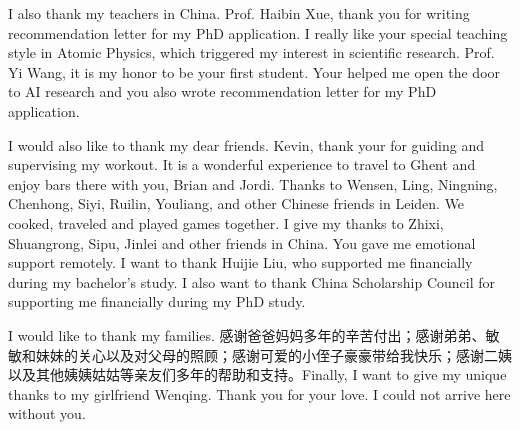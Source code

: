I also thank my teachers in China. Prof. Haibin Xue, thank you for writing recommendation letter for my PhD application. I really like your special teaching style in Atomic Physics, which triggered my interest in scientific research. Prof. Yi Wang, it is my honor to be your first student. Your helped me open the door to AI research and you also wrote recommendation letter for my PhD application.

I would also like to thank my dear friends. Kevin, thank your for guiding and supervising my workout. It is a wonderful experience to travel to Ghent and enjoy bars there with you, Brian and Jordi. Thanks to Wensen, Ling, Ningning, Chenhong, Siyi, Ruilin, Youliang, and other Chinese friends in Leiden. We cooked, traveled and played games together. I give my thanks to Zhixi, Shuangrong, Sipu, Jinlei and other friends in China. You gave me emotional support remotely. I want to thank Huijie Liu, who supported me financially during my bachelor's study. I also want to thank China Scholarship Council for supporting me financially during my PhD study.

I would like to thank my families. 感谢爸爸妈妈多年的辛苦付出；感谢弟弟、敏敏和妹妹的关心以及对父母的照顾；感谢可爱的小侄子豪豪带给我快乐；感谢二姨以及其他姨姨姑姑等亲友们多年的帮助和支持。Finally, I want to give my unique thanks to my girlfriend Wenqing. Thank you for your love. I could not arrive here without you.


